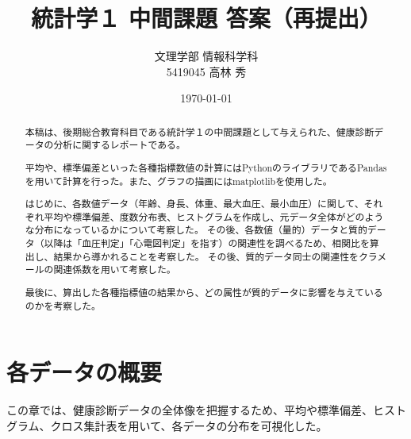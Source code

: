 \documentclass[dvipdfmx]{jsarticle}
\title{統計学１ 中間課題 答案（再提出）}
\author{文理学部 情報科学科\\5419045 高林 秀}
\date{\today}
\begin{document}
\maketitle

\begin{abstract}
    本稿は、後期総合教育科目である統計学１の中間課題として与えられた、健康診断データの分析に関するレポートである。\par 
    平均や、標準偏差といった各種指標数値の計算にはPythonのライブラリであるPandasを用いて計算を行った。また、グラフの描画にはmatplotlibを使用した。\par 
    はじめに、各数値データ（年齢、身長、体重、最大血圧、最小血圧）に関して、それぞれ平均や標準偏差、度数分布表、ヒストグラムを作成し、元データ全体がどのような分布になっているかについて考察した。 
    その後、各数値（量的）データと質的データ（以降は「血圧判定」「心電図判定」を指す）の関連性を調べるため、相関比を算出し、結果から導かれることを考察した。
    その後、質的データ同士の関連性をクラメールの関連係数を用いて考察した。\par 
    最後に、算出した各種指標値の結果から、どの属性が質的データに影響を与えているのかを考察した。
\end{abstract}
\tableofcontents

\section{各データの概要}

    この章では、健康診断データの全体像を把握するため、平均や標準偏差、ヒストグラム、クロス集計表を用いて、各データの分布を可視化した。\par
\end{document}
